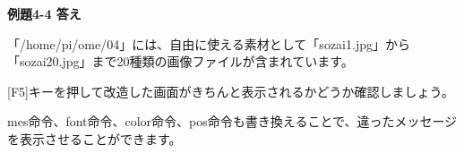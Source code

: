 \documentclass[a4paper,dvipdfmx]{jarticle}
\begin{document}
\bigskip


\bigskip


\bigskip


\bigskip


\bigskip


\bigskip


\bigskip


\bigskip


\bigskip


\bigskip


\bigskip


\bigskip


\bigskip


\bigskip


\bigskip


\bigskip


\bigskip


\bigskip


\bigskip


\bigskip


\bigskip


\bigskip


\bigskip


\bigskip


\bigskip


\bigskip


\bigskip


\bigskip


\bigskip


\bigskip


\bigskip


\bigskip


\bigskip


\bigskip


\bigskip


\bigskip


\bigskip


\bigskip


\bigskip


\bigskip


\bigskip

{\bfseries
例題4-4 答え}


\bigskip

「/home/pi/ome/04」には、自由に使える素材として「sozai1.jpg」から「sozai20.jpg」まで20種類の画像ファイルが含まれています。

[F5]キーを押して改造した画面がきちんと表示されるかどうか確認しましょう。

mes命令、font命令、color命令、pos命令も書き換えることで、違ったメッセージを表示させることができます。
\end{document}
